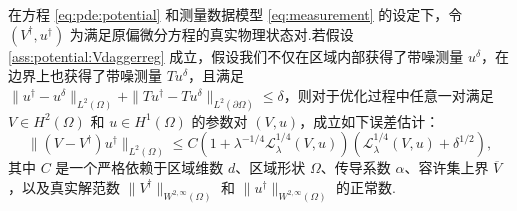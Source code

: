 \begin{theorem}[稳定性估计]\label{th:potential:stability}
在方程 \eqref{eq:pde:potential} 和测量数据模型 \eqref{eq:measurement} 的设定下，令 $(V^{\dagger},u^{\dagger})$ 为满足原偏微分方程的真实物理状态对.若假设 \ref{ass:potential:Vdaggerreg} 成立，假设我们不仅在区域内部获得了带噪测量 $u^\delta$，在边界上也获得了带噪测量 $Tu^\delta$，且满足 $\|u^\dagger - u^\delta\|_{L^2(\Omega)} + \|Tu^\dagger - Tu^\delta\|_{L^2(\partial\Omega)} \leq \delta$，则对于优化过程中任意一对满足 $V\in H^{2}(\Omega)$ 和 $u \in H^1(\Omega)$ 的参数对 $(V,u)$，成立如下误差估计：
\begin{equation*}
\|(V-V^{\dagger})u^{\dagger}\|_{L^{2}(\Omega)} \leq C\left(1+\lambda^{-1/4}\mathcal{L}_{\lambda}^{1/4}(V,u)\right)\left(\mathcal{L}_{\lambda}^{1/4}(V,u)+\delta^{1/2}\right),
\end{equation*}
其中 $C$ 是一个严格依赖于区域维数 $d$、区域形状 $\Omega$、传导系数 $\alpha$、容许集上界 $\overline{V}$，以及真实解范数 $\|V^{\dagger}\|_{W^{2,\infty}(\Omega)}$ 和 $\|u^{\dagger}\|_{W^{2,\infty}(\Omega)}$ 的正常数.
\end{theorem}

